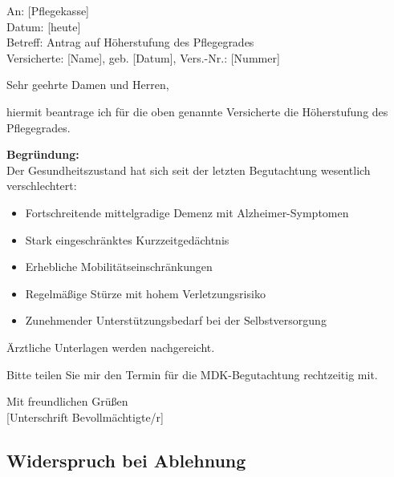 \documentclass[11pt,a4paper]{article}
\begin{document}
\begin{graybox}
\small
An: [Pflegekasse]\\
Datum: [heute]\\
Betreff: Antrag auf Höherstufung des Pflegegrades\\
Versicherte: [Name], geb. [Datum], Vers.-Nr.: [Nummer]

\vspace{0.3cm}
Sehr geehrte Damen und Herren,

hiermit beantrage ich für die oben genannte Versicherte die Höherstufung des Pflegegrades.

\textbf{Begründung:}\\
Der Gesundheitszustand hat sich seit der letzten Begutachtung wesentlich verschlechtert:

\begin{itemize}[noitemsep]
    \item Fortschreitende mittelgradige Demenz mit Alzheimer-Symptomen
    \item Stark eingeschränktes Kurzzeitgedächtnis
    \item Erhebliche Mobilitätseinschränkungen
    \item Regelmäßige Stürze mit hohem Verletzungsrisiko
    \item Zunehmender Unterstützungsbedarf bei der Selbstversorgung
\end{itemize}

Ärztliche Unterlagen werden nachgereicht.

Bitte teilen Sie mir den Termin für die MDK-Begutachtung rechtzeitig mit.

Mit freundlichen Grüßen\\
{[Unterschrift Bevollmächtigte/r]}
\end{graybox}

\subsection{Widerspruch bei Ablehnung}
\end{document}
